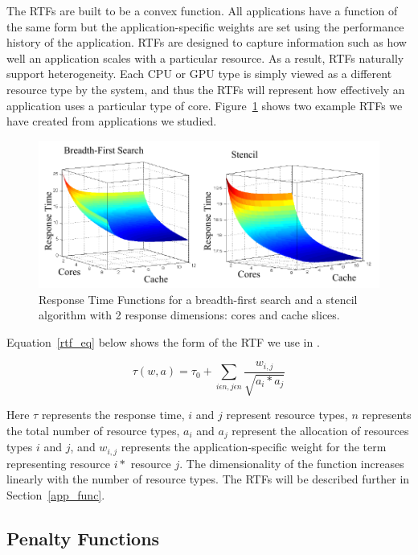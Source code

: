 The RTFs are built to be a convex function.  All applications have a function of the same form but the application-specific weights are set using the performance history of the application.  RTFs are designed to capture information such as how well an application scales with a particular resource. As a result, RTFs naturally support heterogeneity.  Each CPU or GPU type is simply viewed as a different resource type by the system, and thus the RTFs will represent how effectively an application uses a particular type of core. Figure~\ref{sample_rtf} shows two example RTFs we have created from applications we studied.

\begin{figure}[hb]
\includegraphics*[width=1.0\columnwidth]{sample_rtf.pdf}
\caption{\label{sample_rtf} Response Time Functions for a breadth-first search and a stencil algorithm with 2 response dimensions: cores and cache slices.}
\end{figure}

Equation~\ref{rtf_eq} below shows the form of the RTF we use in \pacora. 

\begin{equation}\label{rtf_eq}
\tau(w,a) = \tau_0 + \sum_{i\epsilon n,j\epsilon n}{\frac{w_{i,j}}{\sqrt{a_i * a_j}}} 
\end{equation}

Here $\tau$ represents the response time, $i$ and $j$ represent resource types, $n$ represents the total number of resource types, $a_{i}$ and $a_{j}$ represent the allocation of resources types $i$ and $j$, and $w_{i,j}$ represents the application-specific weight for the term representing resource $i*$ resource $j$.  The dimensionality of the function increases linearly with the number of resource types. The RTFs will be described further in Section~\ref{app_func}.

\subsection*{Penalty Functions}

